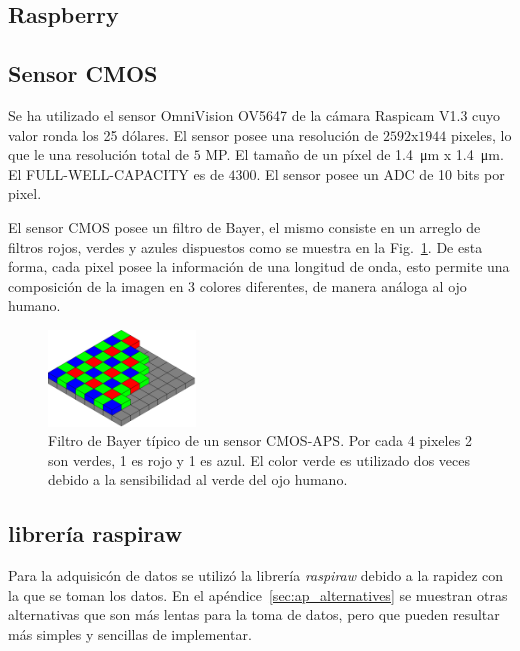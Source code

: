 \documentclass[twoside,twocolumn]{article}
\begin{document}
  \subsection{Raspberry}

  \subsection{Sensor CMOS}
  Se ha utilizado el sensor OmniVision OV5647 de la cámara Raspicam V1.3 cuyo valor ronda los 25 dólares.
  El sensor posee una resolución de	$2592$x$1944$ pixeles, lo que le una resolución total de $5$ MP.
  El tamaño de un píxel de \SI{1.4}{\micro\meter} x \SI{1.4}{\micro\meter}.
  El FULL-WELL-CAPACITY es de $4300$.
  El sensor posee un ADC de 10 bits por pixel.

  El sensor CMOS posee un filtro de Bayer, el mismo consiste en un arreglo de filtros rojos, verdes y azules
  dispuestos como se muestra en la Fig.~\ref{fig:bayer}. De esta forma, cada pixel posee la información de una longitud de onda,
  esto permite una composición de la imagen en 3 colores diferentes, de manera análoga al ojo humano.

  \begin{figure}[h]
    \includegraphics[width=0.35\textwidth]{figures/Bayer_pattern.png}
    \caption{Filtro de Bayer típico de un sensor CMOS-APS. Por cada 4 pixeles 2 son verdes, 1 es rojo y 1 es azul.
      El color verde es utilizado dos veces debido a la sensibilidad al verde del ojo humano.}
    \label{fig:bayer}
  \end{figure}

  \subsection{librería raspiraw}
  Para la adquisicón de datos se utilizó la librería {\it raspiraw}\cite{raspiraw} debido a la rapidez con la que se toman los datos.
  En el apéndice~\ref{sec:ap_alternatives} se muestran otras alternativas que son más lentas para la toma de datos,
  pero que pueden resultar más simples y sencillas de implementar.

\end{document}

